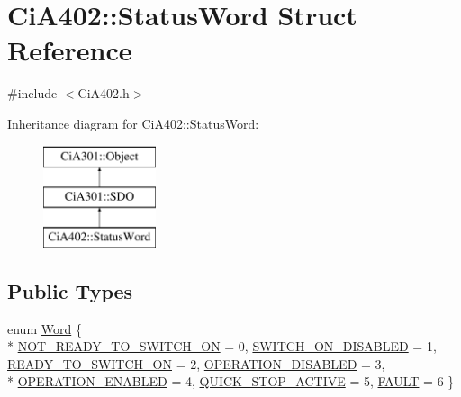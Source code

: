 \hypertarget{struct_ci_a402_1_1_status_word}{\section{Ci\-A402\-:\-:Status\-Word Struct Reference}
\label{struct_ci_a402_1_1_status_word}
}


{\ttfamily \#include $<$Ci\-A402.\-h$>$}

Inheritance diagram for Ci\-A402\-:\-:Status\-Word\-:\begin{figure}[H]
\begin{center}
\leavevmode
\includegraphics[height=3.000000cm]{db/d05/struct_ci_a402_1_1_status_word}
\end{center}
\end{figure}
\subsection*{Public Types}
\begin{DoxyCompactItemize}
\item 
enum \hyperlink{struct_ci_a402_1_1_status_word_a9f47eab9ccb339144eb9c5848109b3e7}{Word} \{ \\*
\hyperlink{struct_ci_a402_1_1_status_word_a9f47eab9ccb339144eb9c5848109b3e7a600f185552846d816d78f5dc51c76cec}{N\-O\-T\-\_\-\-R\-E\-A\-D\-Y\-\_\-\-T\-O\-\_\-\-S\-W\-I\-T\-C\-H\-\_\-\-O\-N} = 0, 
\hyperlink{struct_ci_a402_1_1_status_word_a9f47eab9ccb339144eb9c5848109b3e7a8c5cd81d3a3bb123e2b76cd14d237adf}{S\-W\-I\-T\-C\-H\-\_\-\-O\-N\-\_\-\-D\-I\-S\-A\-B\-L\-E\-D} = 1, 
\hyperlink{struct_ci_a402_1_1_status_word_a9f47eab9ccb339144eb9c5848109b3e7ad1002bcf773ba6d2b925a13b3edb43d5}{R\-E\-A\-D\-Y\-\_\-\-T\-O\-\_\-\-S\-W\-I\-T\-C\-H\-\_\-\-O\-N} = 2, 
\hyperlink{struct_ci_a402_1_1_status_word_a9f47eab9ccb339144eb9c5848109b3e7a254f8875a4090d947d8f212046b03487}{O\-P\-E\-R\-A\-T\-I\-O\-N\-\_\-\-D\-I\-S\-A\-B\-L\-E\-D} = 3, 
\\*
\hyperlink{struct_ci_a402_1_1_status_word_a9f47eab9ccb339144eb9c5848109b3e7afad6e87d3f93d5d4e8cb38d7cd5b6286}{O\-P\-E\-R\-A\-T\-I\-O\-N\-\_\-\-E\-N\-A\-B\-L\-E\-D} = 4, 
\hyperlink{struct_ci_a402_1_1_status_word_a9f47eab9ccb339144eb9c5848109b3e7a9eb6608db79cd0442699d0483613c4db}{Q\-U\-I\-C\-K\-\_\-\-S\-T\-O\-P\-\_\-\-A\-C\-T\-I\-V\-E} = 5, 
\hyperlink{struct_ci_a402_1_1_status_word_a9f47eab9ccb339144eb9c5848109b3e7a7f043dc593925d89de0d9c383da079db}{F\-A\-U\-L\-T} = 6
 \}
\end{DoxyCompactItemize}
